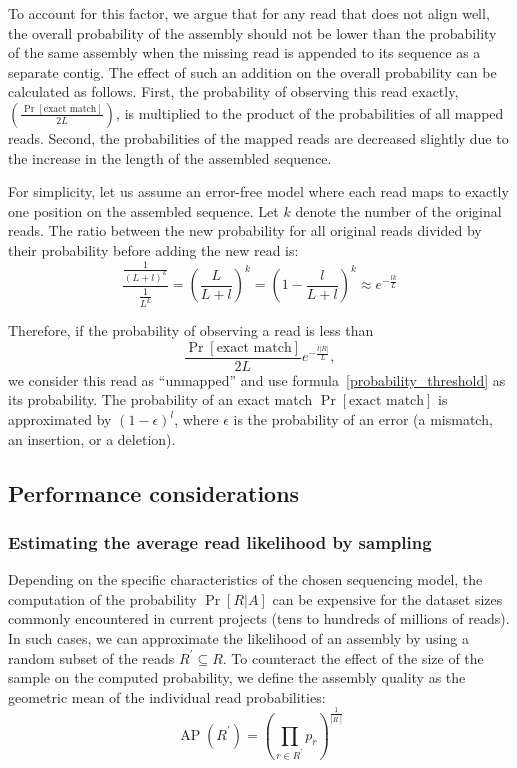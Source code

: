 To account for this factor, we argue that for any read that does not
align well, the overall probability of the assembly should not be
lower than the probability of the same assembly when the missing read
is appended to its sequence as a separate contig. The effect of such an addition on the
overall probability can be calculated as follows.  First, the
probability of observing this read exactly,
$\left(\frac{\Pr[\text{exact match}]}{2L}\right)$, is multiplied to
the product of the probabilities of all mapped reads.  Second, the
probabilities of the mapped reads are decreased slightly due to the
increase in the length of the assembled sequence.

For simplicity, let us assume an error-free model where each read maps
to exactly one position on the assembled sequence.  Let $k$ denote the
number of the original reads. The ratio between the new probability
for all original reads divided by their probability before adding the
new read is:
\[
  \frac{\frac{1}{(L + l)^k}}{\frac{1}{L^k}} = \left(\frac{L}{L + l}\right)^k = \left(1-\frac{l}{L + l}\right)^k \approx e^{-\frac{lk}{L}}
\]

Therefore, if the probability of observing a read is less than
\begin{equation}
  \label{probability_threshold}
  \frac{\Pr[\text{exact match}]}{2L}e^{-\frac{l\left\vert R\right\vert}{L}},
\end{equation}
we consider this read as ``unmapped'' and
use formula~\eqref{probability_threshold} as its probability.  The probability
of an exact match $\Pr[\text{exact match}]$ is approximated by
$\left(1 - \epsilon\right)^{l}$, where $\epsilon$ is the probability of
an error (a mismatch, an insertion, or a deletion).

\subsection{Performance considerations}
\subsubsection{Estimating the average read likelihood by sampling}
\label{sampling_reads}
Depending on the specific characteristics of the chosen sequencing model, the computation of the probability $\Pr[R \vert A]$ can be expensive
for the dataset sizes commonly encountered in current projects (tens
to hundreds of millions of reads).  In such cases, we can approximate
the likelihood of an assembly by using a random subset of the reads
$R^\prime \subseteq R$. To counteract the effect of the size of the
sample on the computed probability, we define the assembly quality as
the geometric mean of the individual read probabilities:
\begin{equation}
  \label{average_probability}
  \operatorname{AP}(R^\prime) =
  \left(\prod_{r \in R^\prime} p_r\right)^{\frac{1}{\left|R^\prime\right|}}
\end{equation}

